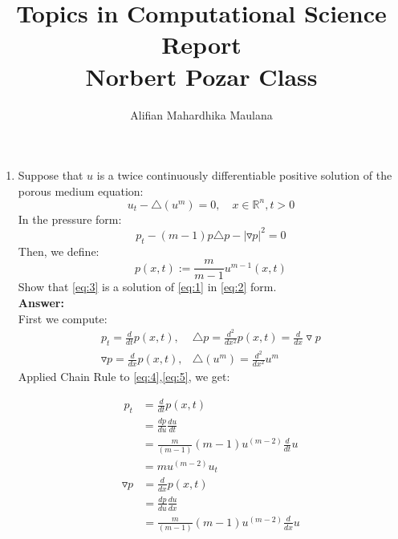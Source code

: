 \documentclass[a4paper,9pt]{article}
\title{Topics in Computational Science Report \\ Norbert Pozar Class}
\author{Alifian Mahardhika Maulana}
\newcommand{\R}{\mathbb{R}}
\begin{document}
\maketitle
\begin{enumerate}
	\item Suppose that $u$ is a twice continuously differentiable positive solution of the porous medium equation:
	\begin{equation}\label{eq:1}
	u_t - \triangle (u^m) = 0, \quad x \in \R^n, t>0
	\end{equation}
	In the pressure form:
	\begin{equation}\label{eq:2}
	p_t - (m-1)p \triangle p - |\triangledown p|^2 = 0
	\end{equation}
	Then, we define:
	\begin{equation}\label{eq:3}
	p(x,t) := \frac{m}{m-1} u^{m-1}(x,t)
	\end{equation}
	Show that \eqref{eq:3} is a solution of \eqref{eq:1} in \eqref{eq:2} form.\\
	\newline
	\textbf{Answer:}\\
	First we compute:
	\begin{eqnarray} \label{eq:4}
	p_t = \frac{d}{dt}p(x,t), & \triangle p = \frac{d^2}{dx^2} p(x,t) = \frac{d}{dx} \triangledown p\\ \label{eq:5}
	\triangledown p = \frac{d}{dx} p(x,t), & \triangle (u^m) = \frac{d^2}{dx^2} u^m
	\end{eqnarray}
	Applied Chain Rule to \eqref{eq:4},\eqref{eq:5}, we get:
	\begin{multicols}{2}
		\begin{equation}\label{eq:6}
		\begin{aligned}
		p_t &= \frac{d}{dt}p(x,t)\\
		&= \frac{dp}{du} \frac{du}{dt}\\
		&= \frac{m}{(m-1)} (m-1) u^{(m-2)} \frac{d}{dt}u\\
		&= m u^{(m-2)} u_t
		\end{aligned}
		\end{equation}
		\newline
		\begin{equation}\label{eq:7}
		\begin{aligned}
		\triangledown p &= \frac{d}{dx} p(x,t)\\
		&= \frac{dp}{du} \frac{du}{dx}\\
		&= \frac{m}{(m-1)} (m-1) u^{(m-2)} \frac{d}{dx}u\\

\end{aligned}
\end{equation}
\end{multicols}
\end{enumerate}
\end{document}
